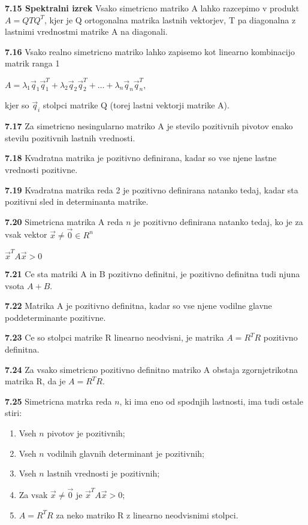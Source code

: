 \documentclass{article}
\begin{document}
\begin{multicols}{2}
	\textbf{7.15 Spektralni izrek} Vsako simetricno matriko A lahko razcepimo v produkt
	$A = QTQ^{T}$, kjer je Q ortogonalna matrika lastnih vektorjev, T pa diagonalna z lastnimi
	vrednostmi matrike A na diagonali.

	\textbf{7.16} Vsako realno simetricno matriko lahko zapisemo kot linearno kombinacijo matrik ranga 1
	\begin{center}
		\begin{math}
			A = \lambda_{1}\vec{q}_{1}\vec{q}_{1}^{T} + \lambda_{2}\vec{q}_{2}\vec{q}_{2}^{T} +
			\dots + \lambda_{n}\vec{q}_{n}\vec{q}_{n}^{T}
		\end{math},
	\end{center}
	kjer so $\vec{q}_{i}$ stolpci matrike Q (torej lastni vektorji matrike A).

	\textbf{7.17} Za simetricno nesingularno matriko A je stevilo pozitivnih pivotov enako
	stevilu pozitivnih lastnih vrednosti.

	\textbf{7.18} Kvadratna matrika je pozitivno definirana, kadar so vse njene lastne vrednosti pozitivne.

	\textbf{7.19} Kvadratna matrika reda 2 je pozitivno definirana natanko tedaj, kadar sta
	pozitivni sled in determinanta matrike.

	\textbf{7.20} Simetricna matrika A reda $n$ je pozitivno definirana natanko tedaj, ko je za vsak
	vektor $\vec{x} \neq \vec{0} \in R^{n}$
	\begin{center}
		$\vec{x}^{T}A\vec{x} > 0$
	\end{center}

	\textbf{7.21} Ce sta matriki A in B pozitivno definitni, je pozitivno definitna tudi
	njuna vsota $A + B$.

	\textbf{7.22} Matrika A je pozitivno definitna, kadar so vse njene vodilne glavne poddeterminante pozitivne.

	\textbf{7.23} Ce so stolpci matrike R linearno neodvisni, je matrika $A = R^{T}R$ pozitivno definitna.

	\textbf{7.24} Za vsako simetricno pozitivno definitno matriko A obstaja zgornjetrikotna matrika R, da
	je $A = R^{T}R$.

	\textbf{7.25} Simetricna matrka reda $n$, ki ima eno od spodnjih lastnosti, ima tudi ostale stiri:
	\begin{enumerate}
		\item Vseh $n$ pivotov je pozitivnih;
		\item Vseh $n$ vodilnih glavnih determinant je pozitivnih;
		\item Vseh $n$ lastnih vrednosti je pozitivnih;
		\item Za vsak $\vec{x} \neq \vec{0}$ je $\vec{x}^{T}A\vec{x} > 0$;
		\item $A= R^{T}R$ za neko matriko R z linearno neodvisnimi stolpci.
	\end{enumerate}


\end{multicols}
\end{document}
